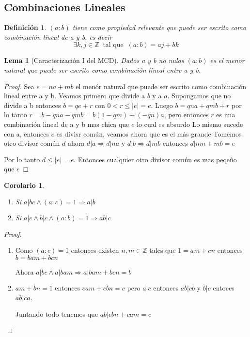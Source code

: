 \documentclass{article}
\theoremstyle{break}
\newtheorem{corollary}{Corolario}[theorem]
\newtheorem{lemma}[theorem]{Lema}
\newtheorem{definition}{Definición}[section]
\def \Z{\mathbb{Z}}
\begin{document}
    \subsection{Combinaciones Lineales}
    \begin{definition}
        $(a:b)$ tiene como propiedad relevante que puede ser escrito como combinación lineal de 
        a y b, es decir $$\exists k,j\in\Z \ \text{ tal que } \ (a:b) = aj + bk$$
    \end{definition}

    \begin{lemma}[Caracterización I del MCD]
        Dados a y b no nulos $(a:b)$ es el menor natural que puede ser escrito como combinación lineal
        entre a y b.
    \end{lemma}
    \begin{proof}
        Sea $e = na + mb$ el menór natural que puede ser escrito como combinación lineal entre a y b.
        Veamos primero que divide a $b$ y a $a$.
        Supongamos que no divide a b entonces $b = qe + r$ con $0<r\leq |e| = e$. Luego $b = qna +qmb +r$
        por lo tanto $r = b -qna -qmb = b(1-qm) + (-qn)a $, pero entonces $r$ es una combinación lineal 
        de a y b mas chica que $e$ lo cual es absurdo
        Lo mismo sucede con a, entonces $e$ es divisr común, veamos ahora que es el más grande
        Tomemos otro divisor común $d$ ahora $d|a \Rightarrow d|na$ y $d|b \Rightarrow d|mb$ entonces $d|nm+mb = e$
        
        Por lo tanto $d \leq |e| = e$. Entonces cualquier otro divisor común es mas peqeño que $e$
    \end{proof}

    \begin{corollary}
        \begin{enumerate}
            \item Si $a|bc \land (a:c) = 1 \Rightarrow a|b$
            \item Si $a|c \land b|c \land (a:b)=1 \Rightarrow ab|c$
        \end{enumerate}
    \end{corollary}
    \begin{proof}
        \begin{enumerate}
            \item Como $(a:c) = 1$ entonces existen $n,m\in\Z$ tales que $1 = am + cn$ entonces $b = bam +bcn$
            
        \indent Ahora $a|bc \land a|bam \Rightarrow a | bam + bcn = b$
            \item $am +bn = 1$ entonces $cam +cbn = c$ pero $a|c$ entonces $ab|cb$ y $b|c$ entoces $ab|ca$.
            
            Juntando todo tenemos que $ab | cbn + cam = c$
        \end{enumerate}
        
    \end{proof}
\end{document}
